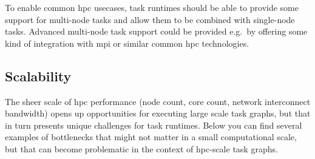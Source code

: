 To enable common \gls{hpc} usecases, task runtimes should be able to provide some
support for multi-node tasks and allow them to be combined with single-node tasks. Advanced
multi-node task support could be provided e.g.\ by offering some kind of integration with
\gls{mpi} or similar common \gls{hpc} technologies.

\subsection{Scalability}
The sheer scale of \gls{hpc} performance (node count, core count, network
interconnect bandwidth) opens up opportunities for executing large scale task graphs, but that in
turn presents unique challenges for task runtimes. Below you can find several examples of
bottlenecks that might not matter in a small computational scale, but that can become problematic
in the context of \gls{hpc}-scale task graphs.

